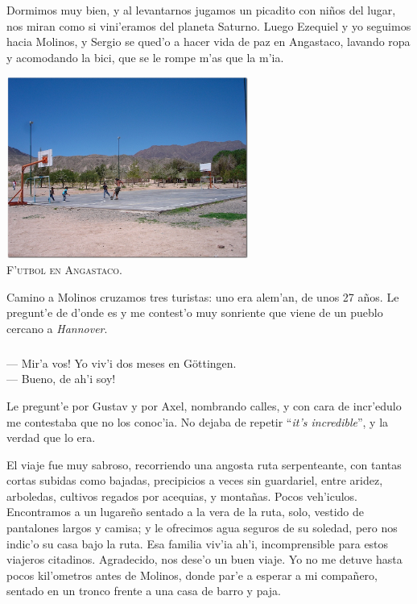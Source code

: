 Dormimos muy bien, y al levantarnos jugamos un picadito con ni\~nos del lugar,
nos miran como si vini'eramos del planeta Saturno. Luego Ezequiel y yo seguimos
hacia Molinos, y Sergio se qued'o a hacer vida de paz en Angastaco, lavando ropa
y acomodando la bici, que se le rompe m'as que la m'ia.

\begin{center} \includegraphics[width=300px]{images/DSC0194.jpg}
\textsc{\\F'utbol en Angastaco.} \end{center}

Camino a Molinos cruzamos tres turistas: uno era alem'an, de unos 27 a\~nos. Le
pregunt'e de d'onde es y me contest'o muy sonriente que viene de un pueblo
cercano a \emph{Hannover}.

\subparagraph{}\label{ssub:gottingen} --- \textexclamdown Mir'a vos! Yo viv'i
dos meses en G\"ottingen.\\ --- Bueno, \textexclamdown de ah'i soy!\\
\hangindent=1cm

Le pregunt'e por Gustav y por Axel, nombrando calles, y con cara de incr'edulo
me contestaba que no los conoc'ia. No dejaba de repetir ``\emph{it's
incredible}'', y la verdad que lo era.

El viaje fue muy sabroso, recorriendo una angosta ruta serpenteante, con tantas
cortas subidas como bajadas, precipicios a veces sin guardariel, entre aridez,
arboledas, cultivos regados por acequias, y monta\~nas. Pocos veh'iculos.
Encontramos a un lugare\~no sentado a la vera de la ruta, solo, vestido de
pantalones largos y camisa; y le ofrecimos agua seguros de su soledad, pero nos
indic'o su casa bajo la ruta. Esa familia viv'ia ah'i, incomprensible para
estos viajeros citadinos. Agradecido, nos dese'o un buen viaje. Yo no me detuve
hasta pocos kil'ometros antes de Molinos, donde par'e a esperar a mi
compa\~nero, sentado en un tronco frente a una casa de barro y paja.

